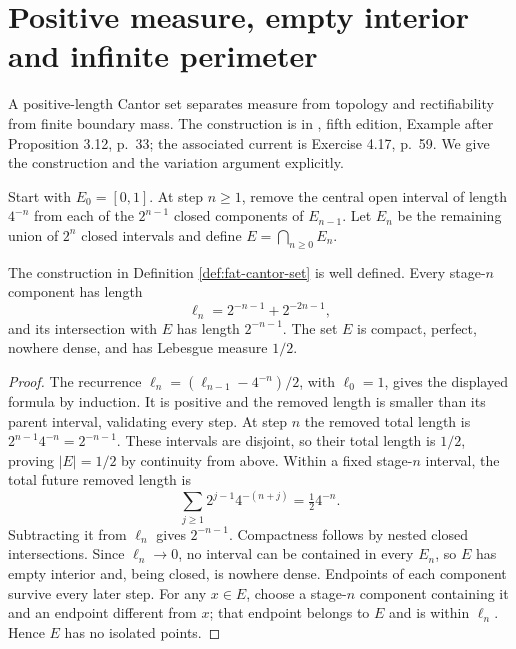 \chapter{Positive measure, empty interior and infinite perimeter}\label{sec:fat-cantor-examples}
A positive-length Cantor set separates measure from topology and rectifiability from finite boundary mass. The construction is in \cite{Mor16}, fifth edition, Example after Proposition 3.12, p.~33; the associated current is Exercise 4.17, p.~59. We give the construction and the variation argument explicitly.

\begin{definition}\label{def:fat-cantor-set}
Start with $E_0=[0,1]$. At step $n\ge1$, remove the central open interval of length $4^{-n}$ from each of the $2^{n-1}$ closed components of $E_{n-1}$. Let $E_n$ be the remaining union of $2^n$ closed intervals and define $E=\bigcap_{n\ge0}E_n$.
\end{definition}

\begin{proposition}\label{prop:fat-cantor-length-topology}
The construction in Definition \ref{def:fat-cantor-set} is well defined. Every stage-$n$ component has length
\[
 \ell_n=2^{-n-1}+2^{-2n-1},
\]
and its intersection with $E$ has length $2^{-n-1}$. The set $E$ is compact, perfect, nowhere dense, and has Lebesgue measure $1/2$.
\end{proposition}
\begin{proof}
The recurrence $\ell_n=(\ell_{n-1}-4^{-n})/2$, with $\ell_0=1$, gives the displayed formula by induction. It is positive and the removed length is smaller than its parent interval, validating every step. At step $n$ the removed total length is $2^{n-1}4^{-n}=2^{-n-1}$. These intervals are disjoint, so their total length is $1/2$, proving $|E|=1/2$ by continuity from above. Within a fixed stage-$n$ interval, the total future removed length is
\[
 \sum_{j\ge1}2^{j-1}4^{-(n+j)}=\tfrac12 4^{-n}.
\]
Subtracting it from $\ell_n$ gives $2^{-n-1}$. Compactness follows by nested closed intersections. Since $\ell_n\to0$, no interval can be contained in every $E_n$, so $E$ has empty interior and, being closed, is nowhere dense. Endpoints of each component survive every later step. For any $x\in E$, choose a stage-$n$ component containing it and an endpoint different from $x$; that endpoint belongs to $E$ and is within $\ell_n$. Hence $E$ has no isolated points.
\end{proof}


